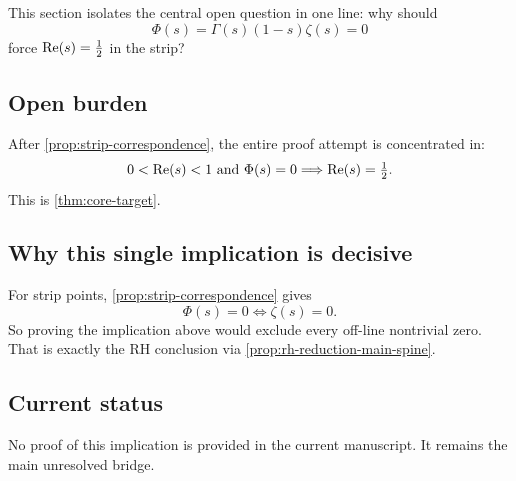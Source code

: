 This section isolates the central open question in one line:
why should
\[
\Phi(s)=\Gamma(s)(1-s)\zeta(s)=0
\]
force $\operatorname{Re}(s)=\tfrac12$ in the strip?

\subsection*{Open burden}
After \cref{prop:strip-correspondence}, the entire proof attempt is concentrated in:
\[
0<\operatorname{Re}(s)<1\ \text{and}\ \Phi(s)=0
\Longrightarrow
\operatorname{Re}(s)=\tfrac12.
\]
This is \cref{thm:core-target}.

\subsection*{Why this single implication is decisive}
For strip points, \cref{prop:strip-correspondence} gives
\[
\Phi(s)=0\iff\zeta(s)=0.
\]
So proving the implication above would exclude every off-line nontrivial zero.
That is exactly the RH conclusion via \cref{prop:rh-reduction-main-spine}.

\subsection*{Current status}
No proof of this implication is provided in the current manuscript.
It remains the main unresolved bridge.
